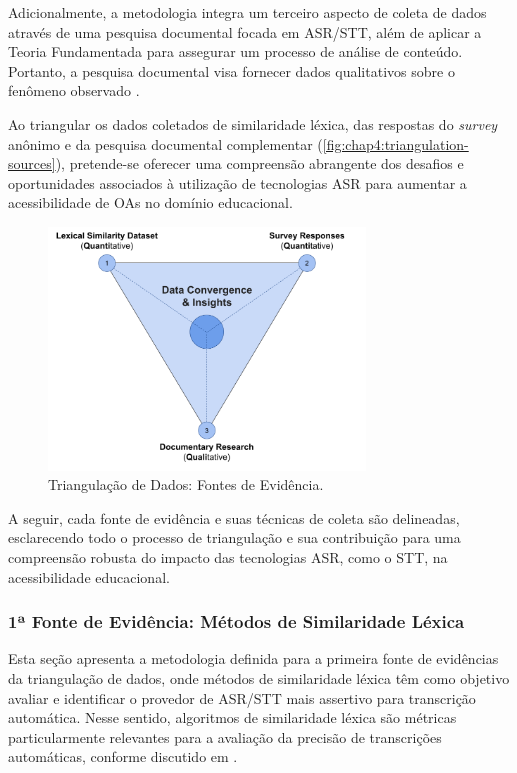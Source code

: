 Adicionalmente, a metodologia integra um terceiro aspecto de coleta de dados através de uma pesquisa documental focada em ASR/STT, além de aplicar a Teoria Fundamentada \cite{Charmaz2009} para assegurar um processo de análise de conteúdo. Portanto, a pesquisa documental visa fornecer dados qualitativos sobre o fenômeno observado \cite{LimaJunior2021}.

Ao triangular os dados coletados de similaridade léxica, das respostas do \textit{survey} anônimo e da pesquisa documental complementar (\autoref{fig:chap4:triangulation-sources}), pretende-se oferecer uma compreensão abrangente dos desafios e oportunidades associados à utilização de tecnologias ASR para aumentar a acessibilidade de OAs no domínio educacional. 

\begin{figure}[htb]
\centering
\includegraphics[width=0.75\textwidth]{images/chapter4-cs1-triangulation-sources.png}
\caption{Triangulação de Dados: Fontes de Evidência.}
\label{fig:chap4:triangulation-sources}
\end{figure}

A seguir, cada fonte de evidência e suas técnicas de coleta são delineadas, esclarecendo todo o processo de triangulação e sua contribuição para uma compreensão robusta do impacto das tecnologias ASR, como o STT, na acessibilidade educacional.

\subsubsection{1ª Fonte de Evidência: Métodos de Similaridade Léxica}

Esta seção apresenta a metodologia definida para a primeira fonte de evidências da triangulação de dados, onde métodos de similaridade léxica têm como objetivo avaliar e identificar o provedor de ASR/STT mais assertivo para transcrição automática. Nesse sentido, algoritmos de similaridade léxica são métricas particularmente relevantes para a avaliação da precisão de transcrições automáticas, conforme discutido em .

